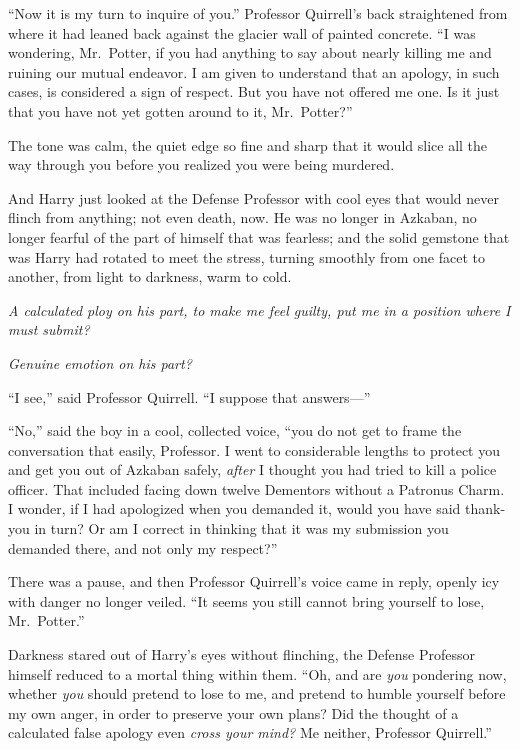 “Now it is my turn to inquire of you.” Professor Quirrell’s back straightened from where it had leaned back against the glacier wall of painted concrete. “I was wondering, Mr.~Potter, if you had anything to say about nearly killing me and ruining our mutual endeavor. I am given to understand that an apology, in such cases, is considered a sign of respect. But you have not offered me one. Is it just that you have not yet gotten around to it, Mr.~Potter?”

The tone was calm, the quiet edge so fine and sharp that it would slice all the way through you before you realized you were being murdered.

And Harry just looked at the Defense Professor with cool eyes that would never flinch from anything; not even death, now. He was no longer in Azkaban, no longer fearful of the part of himself that was fearless; and the solid gemstone that was Harry had rotated to meet the stress, turning smoothly from one facet to another, from light to darkness, warm to cold.

\emph{A calculated ploy on his part, to make me feel guilty, put me in a position where I must submit?}

\emph{Genuine emotion on his part?}

“I see,” said Professor Quirrell. “I suppose that answers—”

“No,” said the boy in a cool, collected voice, “you do not get to frame the conversation that easily, Professor. I went to considerable lengths to protect you and get you out of Azkaban safely, \emph{after} I thought you had tried to kill a police officer. That included facing down twelve Dementors without a Patronus Charm. I wonder, if I had apologized when you demanded it, would you have said thank-you in turn? Or am I correct in thinking that it was my submission you demanded there, and not only my respect?”

There was a pause, and then Professor Quirrell’s voice came in reply, openly icy with danger no longer veiled. “It seems you still cannot bring yourself to lose, Mr.~Potter.”

Darkness stared out of Harry’s eyes without flinching, the Defense Professor himself reduced to a mortal thing within them. “Oh, and are \emph{you} pondering now, whether \emph{you} should pretend to lose to me, and pretend to humble yourself before my own anger, in order to preserve your own plans? Did the thought of a calculated false apology even \emph{cross your mind?} Me neither, Professor Quirrell.”

